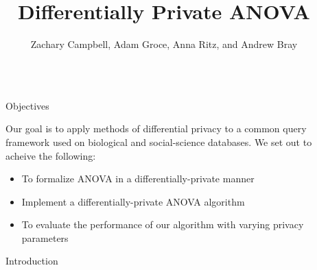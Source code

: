 \documentclass[final]{beamer}
\title{Differentially Private ANOVA} %
\author{Zachary Campbell, Adam Groce, Anna Ritz, and Andrew Bray} %
\institute{Reed College} %
\newlength{\sepwid}
\newlength{\onecolwid}
\begin{document}

\setlength{\belowcaptionskip}{2ex} %
\setlength\belowdisplayshortskip{2ex} %

\begin{frame}[t] %

\begin{columns}[t] %

\begin{column}{\sepwid}\end{column} %

\begin{column}{\onecolwid} %


\begin{alertblock}{Objectives}

Our goal is to apply methods of differential privacy to a common query framework used on biological and social-science databases. We set out to acheive the following:

\begin{itemize}
\item To formalize ANOVA in a differentially-private manner
\item Implement a differentially-private ANOVA algorithm 
\item To evaluate the performance of our algorithm with varying privacy parameters 
\end{itemize}

\end{alertblock}


\begin{block}{Introduction}



\end{block}
\end{column}
\end{columns}
\end{frame}
\end{document}
